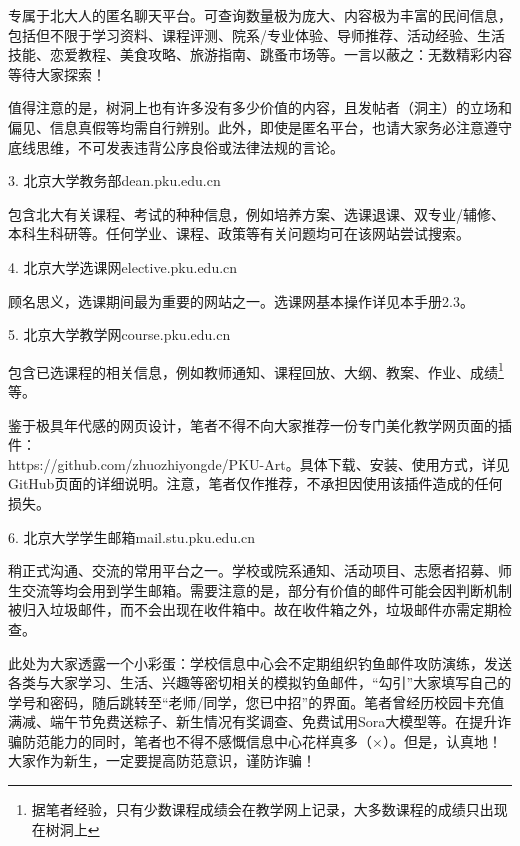 \documentclass[11pt,oneside]{book}
\begin{document}
专属于北大人的匿名聊天平台。可查询数量极为庞大、内容极为丰富的民间信息，包括但不限于学习资料、课程评测、院系/专业体验、导师推荐、活动经验、生活技能、恋爱教程、美食攻略、旅游指南、跳蚤市场等。一言以蔽之：无数精彩内容等待大家探索！

值得注意的是，树洞上也有许多没有多少价值的内容，且发帖者（洞主）的立场和偏见、信息真假等均需自行辨别。此外，即使是匿名平台，也请大家务必注意遵守底线思维，不可发表违背公序良俗或法律法规的言论。

\vspace{20pt}

3. 北京大学教务部\quad dean.pku.edu.cn

包含北大有关课程、考试的种种信息，例如培养方案、选课退课、双专业/辅修、本科生科研等。任何学业、课程、政策等有关问题均可在该网站尝试搜索。

\vspace{20pt}

4. 北京大学选课网\quad elective.pku.edu.cn

顾名思义，选课期间最为重要的网站之一。选课网基本操作详见本手册2.3。

\vspace{20pt}

5. 北京大学教学网\quad course.pku.edu.cn

包含已选课程的相关信息，例如教师通知、课程回放、大纲、教案、作业、成绩\footnote{据笔者经验，只有少数课程成绩会在教学网上记录，大多数课程的成绩只出现在树洞上}等。

鉴于极具年代感的网页设计，笔者不得不向大家推荐一份专门美化教学网页面的插件：\\https://github.com/zhuozhiyongde/PKU-Art。具体下载、安装、使用方式，详见GitHub页面的详细说明。注意，笔者仅作推荐，不承担因使用该插件造成的任何损失。

\vspace{20pt}

6. 北京大学学生邮箱\quad mail.stu.pku.edu.cn 

稍正式沟通、交流的常用平台之一。学校或院系通知、活动项目、志愿者招募、师生交流等均会用到学生邮箱。需要注意的是，部分有价值的邮件可能会因判断机制被归入垃圾邮件，而不会出现在收件箱中。故在收件箱之外，垃圾邮件亦需定期检查。

此处为大家透露一个小彩蛋：学校信息中心会不定期组织钓鱼邮件攻防演练，发送各类与大家学习、生活、兴趣等密切相关的模拟钓鱼邮件，“勾引”大家填写自己的学号和密码，随后跳转至“老师/同学，您已中招”的界面。笔者曾经历校园卡充值满减、端午节免费送粽子、新生情况有奖调查、免费试用Sora大模型等。在提升诈骗防范能力的同时，笔者也不得不感慨信息中心花样真多（$\times$）。但是，认真地！大家作为新生，一定要提高防范意识，谨防诈骗！
\end{document}
